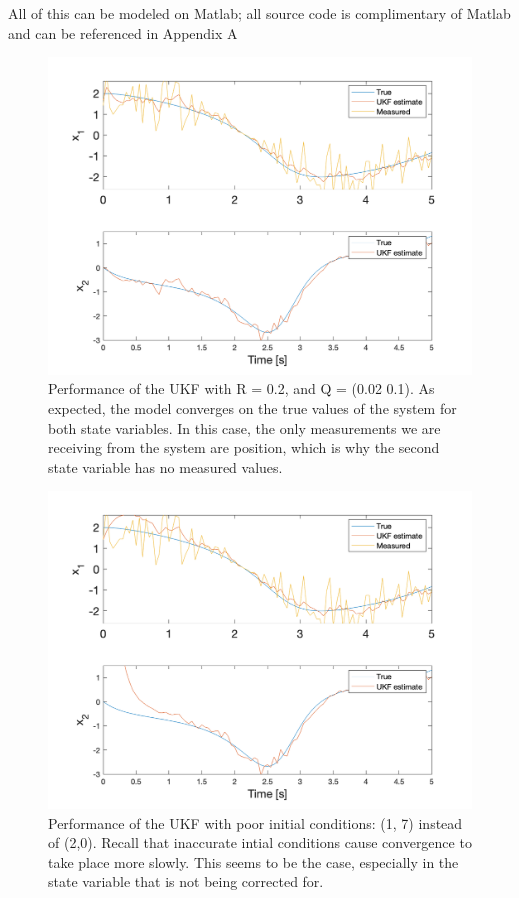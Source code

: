 \noindent All of this can be modeled on Matlab; all source code is complimentary of Matlab and can be referenced in Appendix A \cite{matlab /& simulink}

\begin{figure}[h]
    \centering
    \includegraphics[scale = 0.6]{VDP.png}
    \caption{Performance of the UKF with R = 0.2, and Q = (0.02 0.1).
    As expected, the model converges on the true values of the system for both state variables. In this case, the only measurements we are receiving from the system are position, which is why the second state variable has no measured values.}
\end{figure}
\begin{figure}[h]
    \centering
    \includegraphics[scale = 0.6]{VDP_badinitial.png}
    \caption{Performance of the UKF with poor initial conditions: (1, 7)  instead of (2,0). Recall that inaccurate intial conditions cause convergence to take place more slowly. This seems to be the case, especially in the state variable that is not being corrected for.}
\end{figure}


